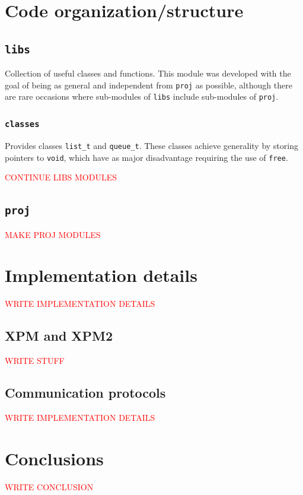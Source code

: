 \documentclass{article}
\theoremstyle{remark}
\begin{document}
\section{Code organization/structure}
\subsection{\texttt{libs}}
Collection of useful classes and functions. This module was developed with the goal of being as general and independent from \texttt{proj} as possible, although there are rare occasions where sub-modules of \texttt{libs} include sub-modules of \texttt{proj}.
\subsubsection{\texttt{classes}}
Provides classes \texttt{list\_t} and \texttt{queue\_t}. These classes achieve generality by storing pointers to \texttt{void}, which have as major disadvantage requiring the use of \texttt{free}. \par
\textcolor{red}{CONTINUE LIBS MODULES}
\subsection{\texttt{proj}}
\textcolor{red}{MAKE PROJ MODULES}
\section{Implementation details} \label{sec:details}
\textcolor{red}{WRITE IMPLEMENTATION DETAILS}
\subsection{XPM and XPM2}
\textcolor{red}{WRITE STUFF}
\subsection{Communication protocols}
\textcolor{red}{WRITE IMPLEMENTATION DETAILS}
\section{Conclusions}
\textcolor{red}{WRITE CONCLUSION}
\end{document}
